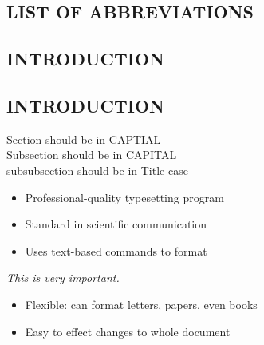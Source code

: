 \documentclass[12pt,a4paper]{article}
\numberwithin{figure}{section}
\numberwithin{table}{section}
\begin{document}
\newpage
{\setlength{\baselineskip}{1\baselineskip}
\begin{center}
\listoftables				%
\end{center}
}
\newpage
\pagestyle{plain}

\begin{center}
\section*{LIST OF ABBREVIATIONS}			%
\end{center}

\newpage

\renewcommand*{\thepage}{\footnotesize\arabic{page}} %
\onehalfspacing
\pagestyle{fancy}
\sectionfont{\fontsize{14}{21}\selectfont}
\begin{center}		
		\section{INTRODUCTION}	
		\end{center}
		\subsection{INTRODUCTION}







Section should be in CAPTIAL\\
Subsection should be in CAPITAL\\
subsubsection should be in Title case 


\begin{itemize}
\item Professional-quality typesetting program
\item Standard in scientific communication
\item Uses text-based commands to format
\end{itemize}


\emph{This is very important.}


\begin{itemize}
\item Flexible: can format letters, papers, even books
\item Easy to effect changes to whole document
\end{itemize}
\end{document}
